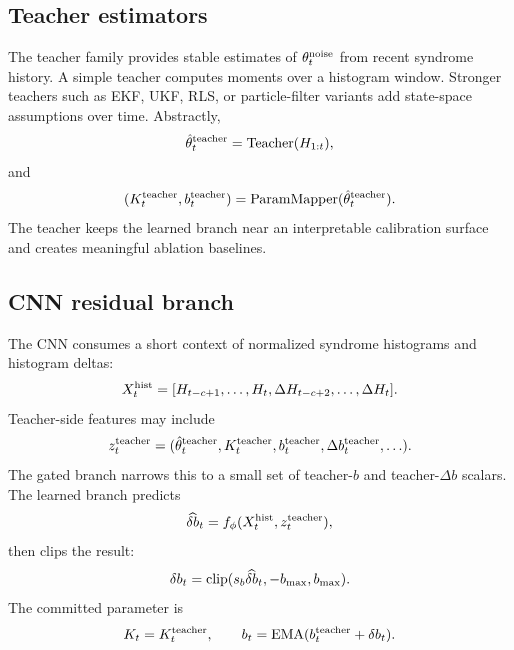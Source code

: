 \documentclass[11pt]{article}
\begin{document}
\subsection{Teacher estimators}

The teacher family provides stable estimates of \(\theta_t^{\rm noise}\) from
recent syndrome history.  A simple teacher computes moments over a histogram
window.  Stronger teachers such as EKF, UKF, RLS, or particle-filter variants
add state-space assumptions over time.  Abstractly,
\begin{equation}
    \hat{\theta}_t^{\rm teacher}={\rm Teacher}(H_{1:t}),
\end{equation}
and
\begin{equation}
    (K_t^{\rm teacher},b_t^{\rm teacher})
    =
    {\rm ParamMapper}(\hat{\theta}_t^{\rm teacher}).
\end{equation}
The teacher keeps the learned branch near an interpretable calibration surface
and creates meaningful ablation baselines.

\subsection{CNN residual branch}

The CNN consumes a short context of normalized syndrome histograms and
histogram deltas:
\begin{equation}
    X_t^{\rm hist}=[H_{t-c+1},\ldots,H_t,\Delta H_{t-c+2},\ldots,\Delta H_t].
\end{equation}
Teacher-side features may include
\begin{equation}
    z_t^{\rm teacher}
    =
    (\hat{\theta}_t^{\rm teacher},
     K_t^{\rm teacher},
     b_t^{\rm teacher},
     \Delta b_t^{\rm teacher},\ldots).
\end{equation}
The gated branch narrows this to a small set of teacher-\(b\) and
teacher-\(\Delta b\) scalars.  The learned branch predicts
\begin{equation}
    \widehat{\delta b}_t=f_\phi(X_t^{\rm hist},z_t^{\rm teacher}),
\end{equation}
then clips the result:
\begin{equation}
    \delta b_t={\rm clip}(s_b\widehat{\delta b}_t,-b_{\max},b_{\max}).
\end{equation}
The committed parameter is
\begin{equation}
    K_t=K_t^{\rm teacher},
    \qquad
    b_t={\rm EMA}(b_t^{\rm teacher}+\delta b_t).
\end{equation}
\end{document}

